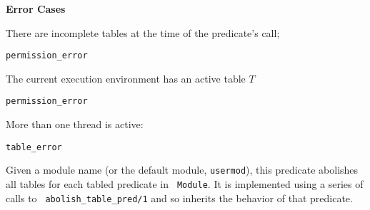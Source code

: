 \begin{description}
\begin{description}
{\bf Error Cases}
\bi
\item There are incomplete tables at the time of the predicate's call;
\bi
\item 	{\tt permission\_error}
\ei
\item The current execution environment has an active table $T$
\bi
\item 	{\tt permission\_error}
\ei
\item More than one thread is active:
\bi
\item 	{\tt table\_error}
\ei
%
%
\ei

\comment{








}
%
Given a module name (or the default module, {\tt usermod}), this
predicate abolishes all tables for each tabled predicate in {\tt
  Module}.  It is implemented using a series of calls to {\tt
  abolish\_table\_pred/1} and so inherits the behavior of that
predicate.


\end{description}
\end{description}
